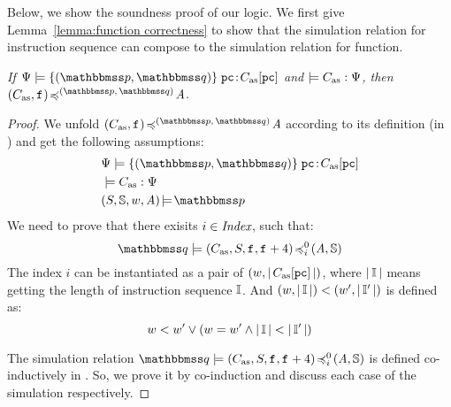 Below, we show the soundness proof of our logic. 
We first give Lemma~\ref{lemma:function correctness} 
to show that the simulation relation for instruction 
sequence can compose to the simulation relation for 
function.
\begin{lemma}
    \label{lemma:function correctness}
    \em
    If $\semwffseqrel{\Cspec{}}{\relastP}{\relastQ}
            {\pc}{\asmimp[\pc]}$ and 
    $\models C_{\text{as}}:\Psi{}$, then 
    $\simFunction{(\asmimp, \lab{})}
        {(\relastP, \, \relastQ)}{\primcom}$.
\end{lemma}
\begin{proof}
    We unfold 
    $\simFunction{(\asmimp, \lab{})}
        {(\relastP, \, \relastQ)}{\primcom}$ according 
    to its definition (in \Def{\ref{def:simfunc}}) 
    and get the following assumptions:
    \begin{align}
        & \semwffseqrel{\Cspec{}}{\relastP}{\relastQ}
            {\pc}{\asmimp[\pc]} \\
        & \models\asmimp:\Cspec{} \\
        & \asrtmodel{(\state, \hpstate, \word, \primcom)}
            {\relastP}
    \end{align}
    We need to prove that there exisits 
    $i \in \textit{Index}$, such that: 
    \[
        \simFunctionSt{\relastQ}{(\asmimp, \state, \lab{}, \lab{}+4)}
                {i}{0}{(\primcom, \hpstate)}
    \]
    The index $i$ can be instantiated as a pair of 
    $(w, |\,C_{\text{as}}[\texttt{pc}]\,|)$, where $|\,\mathbb{I}\,|$ means 
    getting the length of instruction sequence $\mathbb{I}$. 
    And $(w, |\, \mathbb{I} \,|) < (w', |\,\mathbb{I}'\,|)$ 
    is defined as:
    \[
        w < w' \lor
        (w = w' \land 
        |\,\mathbb{I}\,| < |\,\mathbb{I}'\,|)
    \]

    The simulation relation $\simFunctionSt{\relastQ}{(\asmimp, \state, \lab{}, \lab{}+4)}
    {i}{0}{(\primcom, \hpstate)}$ is defined co-inductively 
    in \Def{\ref{def:sim-imp-prim-state}}. So, we prove 
    it by co-induction and discuss each case of the simulation
    respectively. 
\end{proof}

